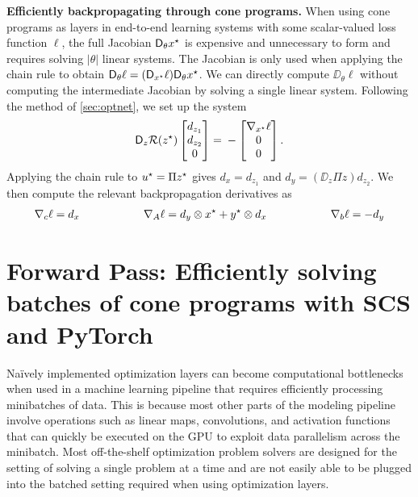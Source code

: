 \textbf{Efficiently backpropagating through cone programs.}
When using cone programs as layers in end-to-end learning systems
with some scalar-valued loss function $\ell$,
the full Jacobian $\mathsf{D}_\theta {x^\star}$ is expensive
and unnecessary to form and requires solving
$|\theta|$ linear systems.
The Jacobian is only used when applying the chain rule
to obtain $\mathsf{D}_\theta \ell = (\mathsf{D}_{x^\star}\ell) \mathsf{D}_\theta {x^\star}$.
We can directly compute $\DD_\theta \ell$ without computing
the intermediate Jacobian by solving a single linear system.
Following the method of \cref{sec:optnet}, we set up the system
\begin{equation}
  \mathsf{D}_z \mathcal{R}({z^\star})
\begin{bmatrix}
  d_{z_1} \\
  d_{z_2} \\
  0 \\
\end{bmatrix} = \\
-
\begin{bmatrix}
  \nabla_{x^\star} \ell \\
  0 \\
  0 \\
\end{bmatrix}.
\end{equation}
Applying the chain rule to ${u^\star}=\Pi {z^\star}$ gives
$d_x = d_{z_1}$ and
$d_y = (\DD_z \Pi z) d_{z_2}$.
We then compute the relevant backpropagation derivatives as
\begin{equation}
  \nabla_c \ell = d_x
  \hspace{20mm}
  \nabla_A \ell = d_y \otimes \xstar + \ystar \otimes d_x
  \hspace{20mm}
  \nabla_b \ell = -d_y
\end{equation}

\section{Forward Pass: Efficiently solving batches of
  cone programs with SCS and PyTorch}
\label{sec:cp:efficient}

Na\"ively implemented optimization layers can become
computational bottlenecks when used in a machine learning
pipeline that requires efficiently processing
minibatches of data.
This is because most other parts of the modeling pipeline
involve operations such as linear maps, convolutions,
and activation functions that can quickly be executed
on the GPU to exploit data parallelism across the minibatch.
Most off-the-shelf optimization problem solvers are designed for
the setting of solving a single problem at a time and are not easily
able to be plugged into the batched setting required
when using optimization layers.

